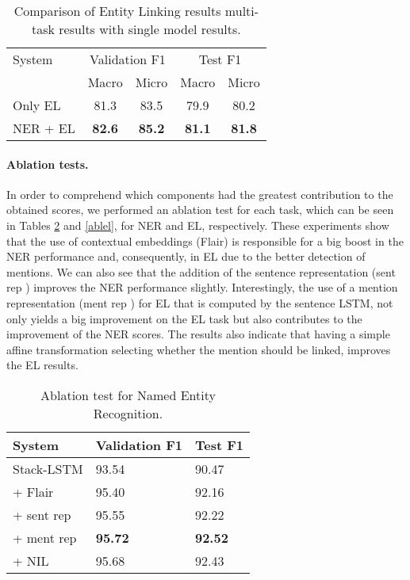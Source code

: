 \documentclass[11pt,a4paper,dvipsnames]{article}
\begin{document}
{
\renewcommand{\arraystretch}{1.2}
\begin{table}[h!]
\begin{centering}\small
\begin{tabular}{lcccc}

\hline 
System &  \multicolumn{2}{c}{Validation F1} & \multicolumn{2}{c}{Test F1} \tabularnewline
& Macro & Micro & Macro & Micro \\
\hline 
Only EL & 81.3 & 83.5 &  79.9 & 80.2 \tabularnewline

NER + EL &  \textbf{82.6} & \textbf{85.2} & \textbf{81.1}  & \textbf{81.8} \tabularnewline
\hline 
\end{tabular}
\par\end{centering}
\centering{}
\caption{Comparison of Entity Linking results multi-task results with single model results.}
\label{jlel}
\end{table}
}

\paragraph{Ablation tests.} In order to comprehend which components had the greatest contribution to the obtained scores, we performed an ablation test for each task, which can be seen in Tables \ref{ablner} and \ref{ablel}, for NER and EL, respectively. These experiments show that the use of contextual embeddings (Flair) is responsible for a big boost in the NER performance and, consequently, in EL due to the better detection of mentions. We can also see that the addition of the sentence representation (sent rep ) improves the NER performance slightly. Interestingly, the use of a mention representation (ment rep ) for EL that is computed by the sentence LSTM, not only yields a big improvement on the EL task but also contributes to the improvement of the NER scores. The results also indicate that having a simple affine transformation selecting whether the mention should be linked, improves the EL results. 

{
\renewcommand{\arraystretch}{1.2}
\begin{table}[h]
\begin{centering}\small
\begin{tabular}{l@{\hskip 0.8cm}p{21mm}p{13mm}}
\hline 
System &  Validation F1 & Test F1 \tabularnewline
\hline 
Stack-LSTM                & 93.54  &  90.47 \tabularnewline
+ Flair                   & 95.40  &  92.16 \tabularnewline
+ sent rep                & 95.55  &  92.22 \tabularnewline
+ ment rep                & \textbf{95.72}  &  \textbf{92.52}\tabularnewline
+ NIL                     & 95.68  &  92.43\tabularnewline

\hline 
\end{tabular}
\par\end{centering}
\centering{}
\caption{Ablation test for Named Entity Recognition.}
\label{ablner}
\end{table}
}
\end{document}
